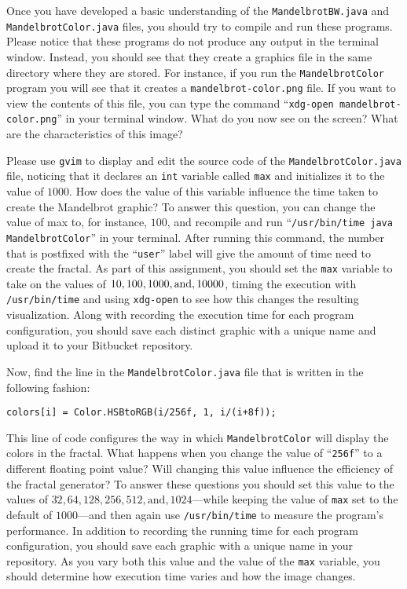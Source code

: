 Once you have developed a basic understanding of the {\tt MandelbrotBW.java} and {\tt MandelbrotColor.java} files, you
should try to compile and run these programs. Please notice that these programs do not produce any output in the
terminal window.  Instead, you should see that they create a graphics file in the same directory where they are stored.
For instance, if you run the {\tt MandelbrotColor} program you will see that it creates a {\tt mandelbrot-color.png}
file.  If you want to view the contents of this file, you can type the command ``{\tt xdg-open mandelbrot-color.png}''
in your terminal window.  What do you now see on the screen? What are the characteristics of this image?

Please use {\tt gvim} to display and edit the source code of the {\tt MandelbrotColor.java} file, noticing that it
declares an {\tt int} variable called {\tt max} and initializes it to the value of $1000$. How does the value of this
variable influence the time taken to create the Mandelbrot graphic? To answer this question, you can change the value of
max to, for instance, $100$, and recompile and run ``{\tt /usr/bin/time java MandelbrotColor}'' in your terminal.
After running this command, the number that is postfixed with the ``{\tt user}'' label will give the amount of time need
to create the fractal. As part of this assignment, you should set the {\tt max} variable to take on the values of $10,
100, 1000, \mbox{and}, \- 10000$, timing the execution with {\tt /usr/bin/time} and using {\tt xdg-open} to see how this
changes the resulting visualization. Along with recording the execution time for each program configuration, you should
save each distinct graphic with a unique name and upload it to your Bitbucket repository.

Now, find the line in the {\tt MandelbrotColor.java} file that is written in the following fashion:

{\tt colors[i] = Color.HSBtoRGB(i/256f, 1, i/(i+8f));}

\noindent This line of code configures the way in which {\tt MandelbrotColor} will display the colors in the fractal.
What happens when you change the value of ``{\tt 256f}'' to a different floating point value? Will changing this value
influence the efficiency of the fractal generator? To answer these questions you should set this value to the values of
$32, 64, 128, 256, 512, \mbox{and}, 1024$---while keeping the value of {\tt max} set to the default of $1000$---and then
again use {\tt /usr/bin/time} to measure the program's performance. In addition to recording the running time for each
program configuration, you should save each graphic with a unique name in your repository.  As you vary both this value
and the value of the {\tt max} variable, you should determine how execution time varies and how the image changes.


